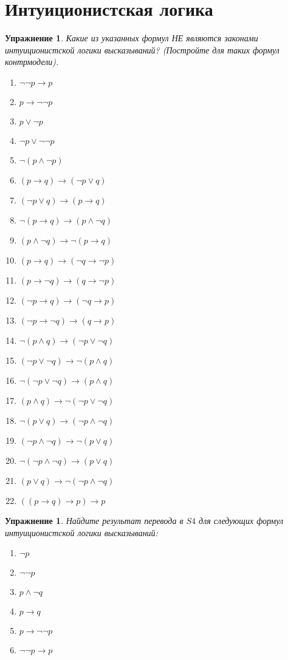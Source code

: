 \documentclass[11pt]{article}
\newtheorem{exercise}[theorem]{Упражнение}
\begin{document}
\section{Интуиционистская логика}
\begin{exercise} Какие из указанных формул НЕ являются законами интуиционистской логики высказываний? (Постройте для таких формул контрмодели).
\begin{multicols}{2}
\begin{enumerate}
	\item $\neg \neg p \to p$
	\item $p \to \neg \neg p$
	\item $p \vee \neg p$
	\item $\neg p \vee \neg \neg p$
	\item $\neg (p \wedge \neg p)$
	\item $(p \to q) \to (\neg p \vee q)$
	\item $(\neg p \vee q) \to (p \to q)$
	\item $\neg (p \to q) \to (p \wedge \neg q)$
	\item $(p \wedge \neg q) \to \neg (p \to q) $
	\item $(p \to q) \to (\neg q \to \neg p)$
	\item $(p \to \neg q) \to (q \to \neg p)$
	\item $(\neg p \to q) \to (\neg q \to p)$
	\item $(\neg p \to \neg q) \to (q \to p)$
	\item $\neg (p \wedge q) \to (\neg p \vee \neg q)$
    \item $(\neg p \vee \neg q) \to \neg (p \wedge q)$
    \item $\neg (\neg p \vee \neg q) \to (p \wedge q)$
    \item $(p \wedge q) \to \neg (\neg p \vee \neg q)$
  	\item $\neg (p \vee q) \to (\neg p \wedge \neg q)$
  	\item $(\neg p \wedge \neg q) \to \neg (p \vee q)$
    \item $\neg  (\neg p \wedge  \neg q) \to (p \vee q)$
    \item $(p \vee q) \to \neg  (\neg p \wedge  \neg q)$
    \item $((p \to q) \to p) \to p $
\end{enumerate}
\end{multicols}
\end{exercise}

\begin{exercise} Найдите результат перевода в $S4$ для следующих формул интуиционистской логики высказываний:
\begin{multicols}{3}
\begin{enumerate}
\item $\neg p$	
\item $\neg \neg p$	
\item $p \wedge \neg q$
\item $p \to q$
\item $p \to \neg \neg p$
\item $\neg \neg p \to p  $
\end{enumerate}
\end{multicols}	
\end{exercise}
\end{document}
